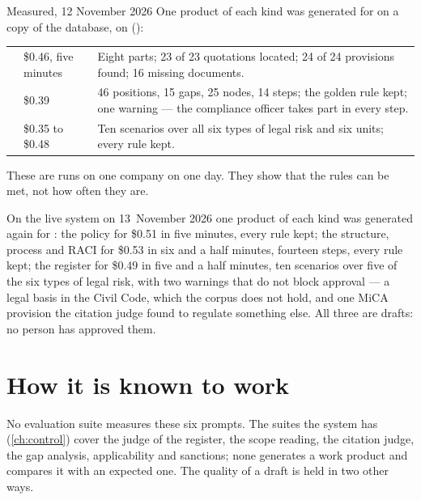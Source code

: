 \begin{lessonbox}{Measured, 12 November 2026}
One product of each kind was generated for \demo{} on a copy of the database, on
 ():

\begin{tabularx}{\linewidth}{@{}L{24mm}L{22mm}Y@{}}
\toprule
{} &  &  \\
\midrule
{} & \$0.46, five minutes & Eight parts; 23 of 23 quotations located; 24 of 24 provisions found; 16 missing documents. \\
 & \$0.39 & 46 positions, 15 gaps, 25 nodes, 14 steps; the golden rule kept; one warning --- the compliance officer takes part in every step. \\
 & \$0.35 to \$0.48 & Ten scenarios over all six types of legal risk and six units; every rule kept. \\
\bottomrule
\end{tabularx}

\smallskip
These are runs on one company on one day. They show that the rules can be met, not how
often they are.

On the live system on 13~November 2026 one product of each kind was generated again for
\demo{}: the policy for \$0.51 in five minutes, every rule kept; the structure, process and
RACI for \$0.53 in six and a half minutes, fourteen steps, every rule kept; the register for
\$0.49 in five and a half minutes, ten scenarios over five of the six types of legal risk,
with two warnings that do not block approval --- a legal basis in the Civil Code, which the
corpus does not hold, and one MiCA provision the citation judge found to regulate something
else. All three are drafts: no person has approved them.
\end{lessonbox}


\section{How it is known to work}\label{sec:programme:evaluation}

No evaluation suite measures these six prompts. The suites the system has
(\cref{ch:control}) cover the judge of the register, the scope reading, the citation judge,
the gap analysis, applicability and sanctions; none generates a work product and compares it
with an expected one. The quality of a draft is held in two other ways.

